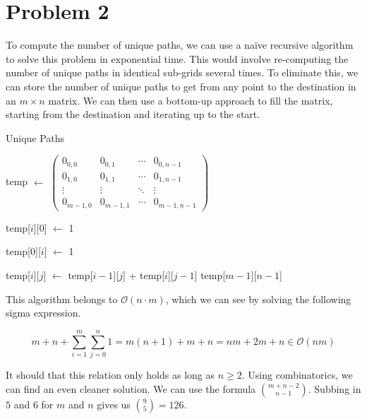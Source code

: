 \documentclass{article}
\newenvironment{problem}[1]{
  \nobreak\section*{Problem #1}
}{}
\newcommand*{\Let}[2]{\State #1 $\gets$ #2}
\newcommand*{\bigO}[1]{\ensuremath{\mathcal{O}\left(#1\right)}}
\begin{document}
  \begin{problem}{2}
    To compute the number of unique paths, we can use a naïve 
    recursive algorithm to solve this problem in exponential time.  
    This would involve re-computing the number of unique paths in
    identical sub-grids several times.  To eliminate this, we can
    store the number of unique paths to get from any point to the
    destination in an $m \times n$ matrix.  We can then use a
    bottom-up approach to fill the matrix, starting from the 
    destination and iterating up to the start.

    \begin{algorithm}
      \caption{Unique Paths}
      \begin{algorithmic}[1]
          \Let{temp}{$\begin{pmatrix}
            0_{0,0} & 0_{0,1} & \cdots & 0_{0,n-1} \\
            0_{1,0} & 0_{1,1} & \cdots & 0_{1,n-1} \\
            \vdots  & \vdots  & \ddots & \vdots  \\
            0_{m-1,0} & 0_{m-1,1} & \cdots & 0_{m-1,n-1} 
            \end{pmatrix}$}

            \Let{temp[$i$][0]}{1}
          \EndFor

            \Let{temp[0][$i$]}{1}
          \EndFor

              \Let{temp[$i$][$j$]}{temp[$i - 1$][$j$] + temp[$i$][$j - 1$]}
            \EndFor
          \EndFor
          \State \Return temp[$m - 1$][$n - 1$]
        \EndFunction
      \end{algorithmic}
    \end{algorithm}

    This algorithm belongs to \bigO{n \cdot m}, which we can see by solving
    the following sigma expression.

    \begin{displaymath}
      m + n + \sum_{i = 1}^{m} \sum_{j = 0}^{n} 1 = m(n + 1) + m + n = nm + 2m + n \in \bigO{nm}
    \end{displaymath}

    It should that this relation only holds as long as $n \ge 2$.
    Using combinatorics, we can find an even cleaner solution.
    We can use the formula $\binom{m + n - 2}{n - 1}$.  Subbing in
    $5$ and $6$ for $m$ and $n$ gives us $\binom{9}{5} = 126$.
  \end{problem}
\end{document}

